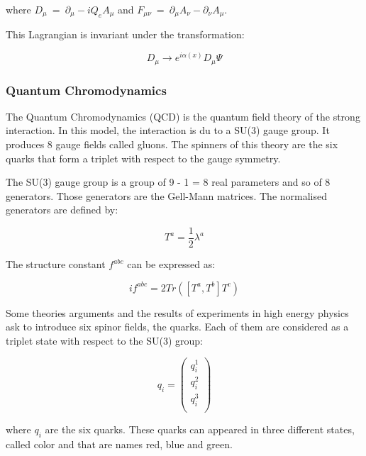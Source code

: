 	where $D_\mu \ = \ \partial_\mu - i Q_e A_\mu$ and $F_{\mu \nu} \ = \ \partial_\mu A_\nu - \partial_\nu A_\mu$.

    This Lagrangian is invariant under the transformation:

    \begin{equation}
        D_{\mu} \rightarrow e^{i\alpha(x)}D_{\mu}\Psi
    \end{equation}
    
      \subsubsection{Quantum Chromodynamics}
    The Quantum Chromodynamics (QCD) is the quantum field theory of the strong interaction.
    In this model, the interaction is du to a SU(3) gauge group. 
    It produces 8 gauge fields called gluons.
    The spinners of this theory are the six quarks that form a triplet with respect to the gauge symmetry.

    The SU(3) gauge group is a group of 9 - 1 = 8 real parameters and so of 8 generators. 
    Those generators are the Gell-Mann matrices. 
    The normalised generators are defined by: 
    
    \begin{equation}
        T^a = \frac{1}{2}\lambda^a
    \end{equation}

    The structure constant $f^{abc}$ can be expressed as:

    \begin{equation}
        if^{abc} = 2 Tr([T^a,T^b]T^c)
    \end{equation}
     
   Some theories arguments and the results of experiments in high energy physics ask to introduce six spinor fields, the quarks.
   Each of them are considered as a triplet state with respect to the SU(3) group:

   \begin{equation}
        q_i = \begin{pmatrix}
                q_i^1 \\
                q_i^2 \\
                q_i^3 \\
              \end{pmatrix}
   \end{equation}
    
    where $q_i$ are the six quarks.
    These quarks can appeared in three different states, called color and that are names red, blue and green.

